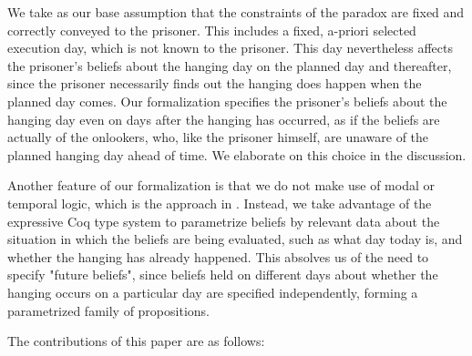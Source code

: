 \documentclass[runningheads]{llncs}
\begin{document}
We take as our base assumption that the constraints of the paradox are
fixed and correctly conveyed to the prisoner. This includes a fixed, a-priori selected execution day, which is not known to the prisoner. This day nevertheless
affects the prisoner's beliefs about the hanging day on the planned day and thereafter,
since the prisoner necessarily finds out the hanging does happen when the planned
day comes. Our formalization specifies
the prisoner's beliefs about the hanging day even on days after the hanging has occurred,
as if the beliefs are actually of the onlookers, who, like the prisoner himself, are unaware
of the planned hanging day ahead of time. We elaborate on this choice in the discussion.

Another feature of our formalization is that we do not make use of modal or temporal logic,
which is the approach in \cite{modalepistemic}.
Instead, we take advantage of the expressive Coq type system to
parametrize beliefs by relevant data about the situation in which the beliefs are
being evaluated, such as what day today is, and whether the hanging has already happened.
This absolves us of the need to specify "future beliefs", since beliefs held on different
days about whether the hanging occurs on a particular day are specified
independently, forming a parametrized family of propositions.

  The contributions of this paper are as follows:
\end{document}
